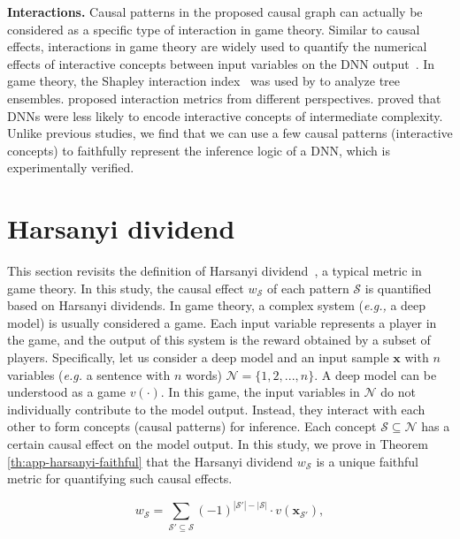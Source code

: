 \textbf{Interactions.}
Causal patterns in the proposed causal graph can actually be considered as a specific type of interaction in game theory.
Similar to causal effects, interactions in game theory are widely used to quantify the numerical effects of interactive concepts between input variables on the DNN output~\cite{sorokina2008detecting,murdoch2018beyond,singh2018hierarchical,jin2019towards,janizek2020explaining}.
In game theory, the Shapley interaction index~\cite{grabisch1999axiomatic} was used by \cite{lundberg2018consistent} to analyze tree ensembles.
\cite{sundararajan2020shapley,tsai2022faith} proposed interaction metrics from different perspectives. 
\cite{deng2022discovering} proved that DNNs were less likely to encode interactive concepts of intermediate complexity.
Unlike previous studies, we find that we can use a few causal patterns (interactive concepts) to faithfully represent the inference logic of a DNN, which is experimentally verified.



\section{Harsanyi dividend}
\label{sec:app-harsanyi-intro}


This section revisits the definition of Harsanyi dividend~\cite{harsanyi1963simplified}, a typical metric in game theory.
In this study, the causal effect {\small$w_{\mathcal{S}}$} of each pattern {\small$\mathcal{S}$} is quantified based on Harsanyi dividends.
In game theory, a complex system (\emph{e.g.,} a deep model) is usually considered a game.
Each input variable represents a player in the game, and the output of this system is the reward obtained by a subset of players.
Specifically, let us consider a deep model and an input sample {\small$\boldsymbol{x}$} with {\small$n$} variables (\emph{e.g.} a sentence with {\small$n$} words) {\small$\mathcal{N}=\{1,2,...,n\}$}.
A deep model can be understood as a game {\small$v(\cdot)$}.
In this game, the input variables in {\small$\mathcal{N}$} do not individually contribute to the model output.
Instead, they interact with each other to form concepts (causal patterns) for inference.
Each concept {\small$\mathcal{S}\subseteq\mathcal{N}$} has a certain causal effect on the model output.
In this study, we prove in Theorem \ref{th:app-harsanyi-faithful} that the Harsanyi dividend {\small$w_{\mathcal{S}}$} is a unique faithful metric for quantifying such causal effects.

\begin{small}
\begin{equation}
    w_{\mathcal{S}} = \sum_{\mathcal{S}'\subseteq\mathcal{S}} (-1)^{|\mathcal{S}'|-|\mathcal{S}|}\cdot v(\boldsymbol{x}_{\mathcal{S}'}),
\end{equation}
\end{small}

